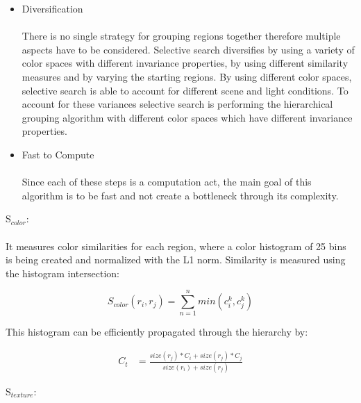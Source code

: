 \begin{itemize}
\begin{figure}[!hbt]
\begin{center}
            \end{center}
        \end{figure}
    \item Diversification \\ \\
        There is no single strategy for grouping regions together therefore multiple aspects have to be considered. Selective search
        diversifies by using a variety of color spaces with different invariance properties, by using different similarity measures and by
        varying the starting regions.  By using different color spaces, selective search is able to account for different scene and light
        conditions. To account for these variances selective search is performing the hierarchical grouping algorithm with different color
        spaces which have different invariance properties. \\
    \item Fast to Compute \\ \\
        Since each of these steps is a computation act, the main goal of this algorithm is to be fast and not create a bottleneck through its complexity.\cite{selectivesearch}
\end{itemize}
S$_{color}$: \\ \\
It measures color similarities for each region, where a color histogram of 25 bins is being created and normalized
with the L1 norm. Similarity is measured using the histogram intersection:\cite{selectivesearch} \\
\begin{center}
    \begin{equation*}
        S_{color}(r_i,r_j) = \sum_{n=1}^{n} min(c_i^{k},c_j^{k})
    \end{equation*}\cite{selectivesearch}
\end{center}
This histogram can be efficiently propagated through the hierarchy by: \\
\begin{center}
    \begin{equation*}
        \begin{split}
            C_t & = \frac{size(r_j)*C_i+size(r_j)*C_j}{size(r_i)+size(r_j)}
        \end{split}
    \end{equation*}\cite{selectivesearch}
\end{center}
S$_{texture}$: \\ \\
